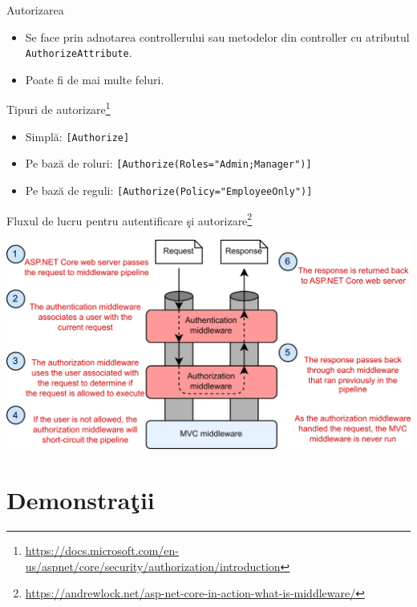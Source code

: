 \documentclass[presentation]{beamer}
\begin{document}
\begin{frame}[label={sec:orgb893d0f},fragile]{Autorizarea}
 \begin{itemize}
\item Se face prin adnotarea controllerului sau metodelor din controller cu atributul \texttt{AuthorizeAttribute}.
\item Poate fi de mai multe feluri.
\end{itemize}
\end{frame}
\begin{frame}[label={sec:org64109fa},fragile]{Tipuri de autorizare\footnote{\url{https://docs.microsoft.com/en-us/aspnet/core/security/authorization/introduction}}}
 \begin{itemize}
\item Simplă: \texttt{[Authorize]}
\item Pe bază de roluri: \texttt{[Authorize(Roles="Admin;Manager")]}
\item Pe bază de reguli: \texttt{[Authorize(Policy="EmployeeOnly")]}
\end{itemize}
\end{frame}
\begin{frame}[label={sec:org0b54b31}]{Fluxul de lucru pentru autentificare şi autorizare\footnote{\url{https://andrewlock.net/asp-net-core-in-action-what-is-middleware/}}}
\begin{center}
\includegraphics[width=\textwidth]{img/auth.png}
\end{center}
\end{frame}
\section{Demonstraţii}
\label{sec:org1f11f33}
\end{document}

